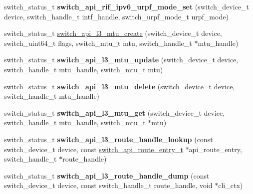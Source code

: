 \begin{DoxyCompactItemize}
\item 
\hypertarget{group__L3_gab40cea9a80acc5f4afa7f24eda030b1e}{switch\+\_\+status\+\_\+t {\bfseries switch\+\_\+api\+\_\+rif\+\_\+ipv6\+\_\+urpf\+\_\+mode\+\_\+set} (switch\+\_\+device\+\_\+t device, switch\+\_\+handle\+\_\+t intf\+\_\+handle, switch\+\_\+urpf\+\_\+mode\+\_\+t urpf\+\_\+mode)}\label{group__L3_gab40cea9a80acc5f4afa7f24eda030b1e}

\item 
switch\+\_\+status\+\_\+t \hyperlink{group__L3_gac14a16e14d6d73f584fb29ef3fee5780}{switch\+\_\+api\+\_\+l3\+\_\+mtu\+\_\+create} (switch\+\_\+device\+\_\+t device, switch\+\_\+uint64\+\_\+t flags, switch\+\_\+mtu\+\_\+t mtu, switch\+\_\+handle\+\_\+t $\ast$mtu\+\_\+handle)
\item 
\hypertarget{group__L3_gaab1b2e6640963653e307984a7ba5fdfe}{switch\+\_\+status\+\_\+t {\bfseries switch\+\_\+api\+\_\+l3\+\_\+mtu\+\_\+update} (switch\+\_\+device\+\_\+t device, switch\+\_\+handle\+\_\+t mtu\+\_\+handle, switch\+\_\+mtu\+\_\+t mtu)}\label{group__L3_gaab1b2e6640963653e307984a7ba5fdfe}

\item 
\hypertarget{group__L3_ga64a69681053bc2ca262668c4b24755cd}{switch\+\_\+status\+\_\+t {\bfseries switch\+\_\+api\+\_\+l3\+\_\+mtu\+\_\+delete} (switch\+\_\+device\+\_\+t device, switch\+\_\+handle\+\_\+t mtu\+\_\+handle)}\label{group__L3_ga64a69681053bc2ca262668c4b24755cd}

\item 
\hypertarget{group__L3_ga6e7731c9deef8c6be42f1a2919cea858}{switch\+\_\+status\+\_\+t {\bfseries switch\+\_\+api\+\_\+l3\+\_\+mtu\+\_\+get} (switch\+\_\+device\+\_\+t device, switch\+\_\+handle\+\_\+t mtu\+\_\+handle, switch\+\_\+mtu\+\_\+t $\ast$mtu)}\label{group__L3_ga6e7731c9deef8c6be42f1a2919cea858}

\item 
\hypertarget{group__L3_ga83af909891c412bbd40e377b7d704b50}{switch\+\_\+status\+\_\+t {\bfseries switch\+\_\+api\+\_\+l3\+\_\+route\+\_\+handle\+\_\+lookup} (const switch\+\_\+device\+\_\+t device, const \hyperlink{group__L3_ga969f26e2a3436107bc9b6e9f749c79b8}{switch\+\_\+api\+\_\+route\+\_\+entry\+\_\+t} $\ast$api\+\_\+route\+\_\+entry, switch\+\_\+handle\+\_\+t $\ast$route\+\_\+handle)}\label{group__L3_ga83af909891c412bbd40e377b7d704b50}

\item 
\hypertarget{group__L3_ga129f195ddb5a18c30b712f9c0c1f9812}{switch\+\_\+status\+\_\+t {\bfseries switch\+\_\+api\+\_\+l3\+\_\+route\+\_\+handle\+\_\+dump} (const switch\+\_\+device\+\_\+t device, const switch\+\_\+handle\+\_\+t route\+\_\+handle, void $\ast$cli\+\_\+ctx)}\label{group__L3_ga129f195ddb5a18c30b712f9c0c1f9812}


\end{DoxyCompactItemize}

